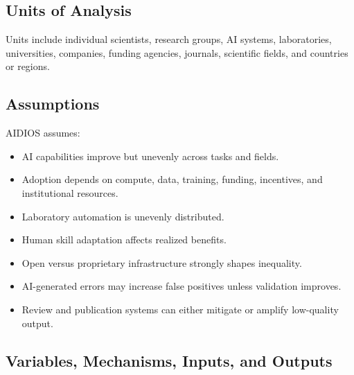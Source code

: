 \documentclass[12pt]{article}
\begin{document}
\subsection{Units of Analysis}

Units include individual scientists, research groups, AI systems, laboratories, universities, companies, funding agencies, journals, scientific fields, and countries or regions.

\subsection{Assumptions}

AIDIOS assumes:
\begin{itemize}[leftmargin=*]
    \item AI capabilities improve but unevenly across tasks and fields.
    \item Adoption depends on compute, data, training, funding, incentives, and institutional resources.
    \item Laboratory automation is unevenly distributed.
    \item Human skill adaptation affects realized benefits.
    \item Open versus proprietary infrastructure strongly shapes inequality.
    \item AI-generated errors may increase false positives unless validation improves.
    \item Review and publication systems can either mitigate or amplify low-quality output.
\end{itemize}

\subsection{Variables, Mechanisms, Inputs, and Outputs}
\end{document}
